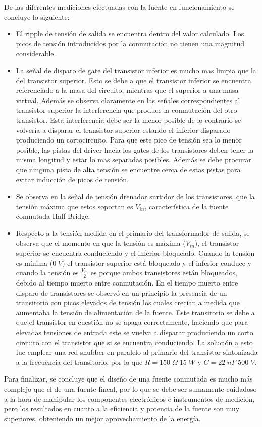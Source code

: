 \documentclass[11pt, a4paper]{article}
\begin{document}
De las diferentes mediciones efectuadas con la fuente en funcionamiento se concluye lo siguiente:
\begin{itemize}
	\item El ripple de tensión de salida se encuentra dentro del valor calculado. Los picos de tensión introducidos por la conmutación no tienen una magnitud considerable.
	\item La señal de disparo de gate del transistor inferior es mucho mas limpia que la del transistor superior. Esto se debe a que el transistor inferior se encuentra referenciado a la masa del circuito, mientras que el superior a una masa virtual. Además se observa claramente en las señales correspondientes al transistor superior la interferencia que produce la conmutación del otro transistor. Esta interferencia debe ser la menor posible de lo contrario se volvería a disparar el transistor superior estando el inferior disparado produciendo un cortocircuito. Para que este pico de tensión sea lo menor posible, las pistas del driver hacia los gates de los transistores deben tener la misma longitud y estar lo mas separadas posibles. Además se debe procurar que ninguna pista de alta tensión se encuentre cerca de estas pistas para evitar inducción de picos de tensión.
	\item Se observa en la señal de tensión drenador surtidor de los transistores, que la tensión máxima que estos soportan es $V_{in}$, característica de la fuente conmutada Half-Bridge.
	\item Respecto a la tensión medida en el primario del transformador de salida, se observa que el momento en que la tensión es máxima ($V_{in}$), el transistor superior se encuentra conduciendo y el inferior bloqueado. Cuando la tensión es mínima ($0 \; V$) el transistor superior está bloqueado y el inferior conduce y cuando la tensión es $\frac{V_{in}}{2}$ es porque ambos transistores están bloqueados, debido al tiempo muerto entre conmutación. En el tiempo muerto entre disparo de transistores se observó en un principio la presencia de un transitorio con picos elevados de tensión los cuales crecían a medida que aumentaba la tensión de alimentación de la fuente. Este transitorio se debe a que el transistor en cuestión no se apaga correctamente, haciendo que para elevadas tensiones de entrada este se vuelva a disparar produciendo un corto circuito con el transistor que si se encuentra conduciendo. La solución a esto fue emplear una red snubber en paralelo al primario del transistor sintonizada a la frecuencia del transitorio, por lo que $R = 150 \; \Omega \; 15 \; W$ y $C = 22 \; nF \; 500 \; V$. 
\end{itemize}

Para finalizar, se concluye que el diseño de una fuente conmutada es mucho más complejo que el de una fuente lineal, por lo que se debe ser sumamente cuidadoso a la hora de manipular los componentes electrónicos e instrumentos de medición, pero los resultados en cuanto a la eficiencia y potencia de la fuente son muy superiores, obteniendo un mejor aprovechamiento de la energía.
\end{document}
